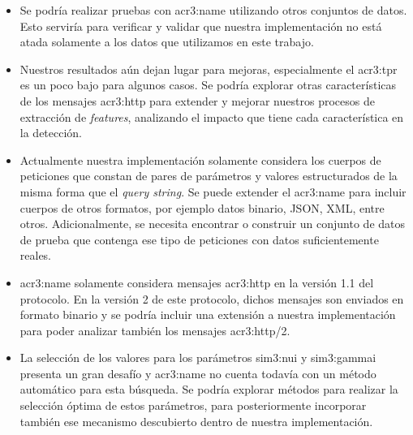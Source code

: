 \begin{itemize}
    \item
    Se podría realizar pruebas con \gls{acr3:name} utilizando otros
    conjuntos de datos. Esto serviría para verificar y validar que nuestra
    implementación no está atada solamente a los datos que utilizamos en
    este trabajo.

    \item
    Nuestros resultados aún dejan lugar para mejoras, especialmente el
    \gls{acr3:tpr} es un poco bajo para algunos casos. Se podría explorar
    otras características de los mensajes \gls{acr3:http} para extender y
    mejorar nuestros procesos de extracción de \textit{features}, analizando
    el impacto que tiene cada característica en la detección.

    \item
    Actualmente nuestra implementación solamente considera los cuerpos
    de peticiones que constan de pares de parámetros y valores estructurados
    de la misma forma que el \textit{query string}. Se puede extender el
    \gls{acr3:name} para incluir cuerpos de otros formatos, por ejemplo
    datos binario, JSON, XML, entre otros.
    Adicionalmente, se necesita encontrar o construir un conjunto de datos
    de prueba que contenga ese tipo de peticiones con datos suficientemente
    reales.

    \item
    \gls{acr3:name} solamente considera mensajes \gls{acr3:http} en la
    versión 1.1 del protocolo. En la versión 2 de este protocolo, dichos
    mensajes son enviados en formato binario \citep{belshe2015http2} %
    y se podría incluir una extensión a nuestra implementación para poder
    analizar también los mensajes \gls{acr3:http}/2.

    \item
    La selección de los valores para los parámetros \gls{sim3:nui} y
    \gls{sim3:gammai} presenta un gran desafío y \gls{acr3:name} no
    cuenta todavía con un método automático para esta búsqueda.
    Se podría explorar métodos para realizar la selección óptima de
    estos parámetros, para posteriormente incorporar también ese
    mecanismo descubierto dentro de nuestra implementación.
\end{itemize}
